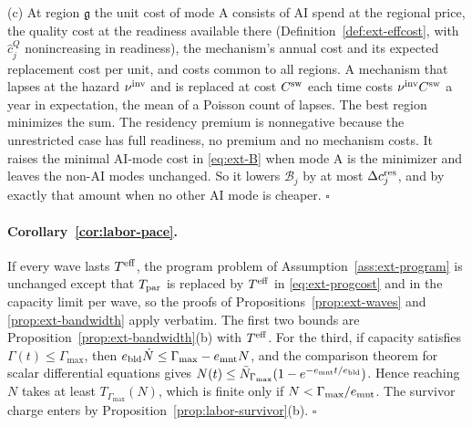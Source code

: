 (c) At region $\mathfrak g$ the unit cost of mode A consists of AI spend at the regional price, the quality cost at the readiness available there (Definition~\ref{def:ext-effcost}, with $\hat c^Q_j$ nonincreasing in readiness), the mechanism's annual cost and its expected replacement cost per unit, and costs common to all regions. A mechanism that lapses at the hazard $\nu^{\rm inv}$ and is replaced at cost $C^{\rm sw}$ each time costs $\nu^{\rm inv}C^{\rm sw}$ a year in expectation, the mean of a Poisson count of lapses. The best region minimizes the sum. The residency premium is nonnegative because the unrestricted case has full readiness, no premium and no mechanism costs. It raises the minimal AI-mode cost in \eqref{eq:ext-B} when mode A is the minimizer and leaves the non-AI modes unchanged. So it lowers $\mathcal B_j$ by at most $\Delta c^{\rm res}_j$, and by exactly that amount when no other AI mode is cheaper. $\square$

\paragraph{Corollary~\ref{cor:labor-pace}.}
If every wave lasts $T^{\rm eff}$, the program problem of Assumption~\ref{ass:ext-program} is unchanged except that $T_{\rm par}$ is replaced by $T^{\rm eff}$ in \eqref{eq:ext-progcost} and in the capacity limit per wave, so the proofs of Propositions~\ref{prop:ext-waves} and \ref{prop:ext-bandwidth} apply verbatim. The first two bounds are Proposition~\ref{prop:ext-bandwidth}(b) with $T^{\rm eff}$. For the third, if capacity satisfies $\Gamma(t)\le\Gamma_{\max}$, then $e_{\rm bld}\dot N\le\Gamma_{\max}-e_{\rm mnt}N$, and the comparison theorem for scalar differential equations gives $N(t)\le\bar N_{\Gamma_{\max}}(1-e^{-e_{\rm mnt}t/e_{\rm bld}})$. Hence reaching $N$ takes at least $T_{\Gamma_{\max}}(N)$, which is finite only if $N<\Gamma_{\max}/e_{\rm mnt}$. The survivor charge enters by Proposition~\ref{prop:labor-survivor}(b). $\square$
